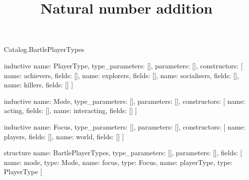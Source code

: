 \begin{lexlean}{Catalog.BartlePlayerTypes}
\title{Natural number addition}
\begin{semanticmodule}
inductive{
  name: PlayerType,
  type_parameters: [],
  parameters: [],
  constructors: [
    {name: achievers, fields: []},
    {name: explorers, fields: []},
    {name: socialisers, fields: []},
    {name: killers, fields: []}
  ]
}

inductive{
  name: Mode,
  type_parameters: [],
  parameters: [],
  constructors: [
    {name: acting, fields: []},
    {name: interacting, fields: []}
  ]
}

inductive{
  name: Focus,
  type_parameters: [],
  parameters: [],
  constructors: [
    {name: players, fields: []},
    {name: world, fields: []}
  ]
}

structure{
  name: BartlePlayerTypes,
  type_parameters: [],
  parameters: [],
  fields: [
    {name: mode, type: Mode},
    {name: focus, type: Focus},
    {name: playerType, type: PlayerType}
  ]
}
\end{semanticmodule}
\end{lexlean}
